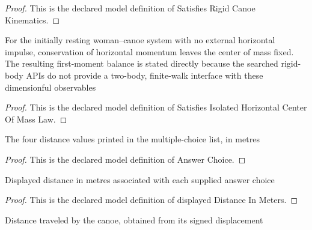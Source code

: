 \begin{proof}
  This is the declared model definition of Satisfies Rigid Canoe Kinematics.
\end{proof}
\begin{definition}
  \label{def:physics:phyx-mini-0769:phyxminiproblems-problemphyxmini0769-satisfiesisolatedhorizontalcenterofmasslaw}
  For the initially resting woman--canoe system with no external horizontal impulse, conservation of horizontal momentum leaves the center of mass fixed. The resulting first-moment balance is stated directly because the searched rigid-body APIs do not provide a two-body, finite-walk interface with these dimensionful observables
\end{definition}
\begin{proof}
  This is the declared model definition of Satisfies Isolated Horizontal Center Of Mass Law.
\end{proof}
\begin{definition}
  \label{def:physics:phyx-mini-0769:phyxminiproblems-problemphyxmini0769-answerchoice}
  The four distance values printed in the multiple-choice list, in metres
\end{definition}
\begin{proof}
  This is the declared model definition of Answer Choice.
\end{proof}
\begin{definition}
  \label{def:physics:phyx-mini-0769:phyxminiproblems-problemphyxmini0769-displayeddistanceinmeters}
  Displayed distance in metres associated with each supplied answer choice
\end{definition}
\begin{proof}
  This is the declared model definition of displayed Distance In Meters.
\end{proof}
\begin{definition}
  \label{def:physics:phyx-mini-0769:phyxminiproblems-problemphyxmini0769-canoetraveldistanceinmeters}
  Distance traveled by the canoe, obtained from its signed displacement
\end{definition}
